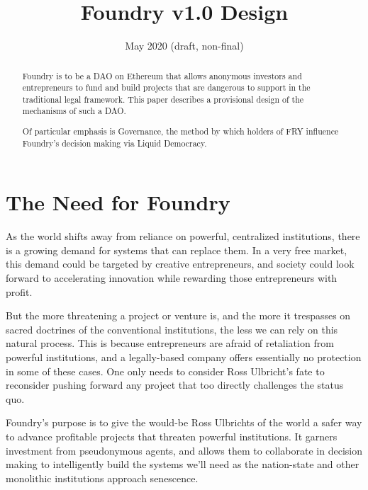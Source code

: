 \documentclass{article}
\title{Foundry v1.0 Design}
\date{May 2020 (draft, non-final)}
\begin{document}

\maketitle
\begin{abstract}
	\setlength{\parskip}{1em}
	Foundry is to be a DAO on Ethereum that allows anonymous investors and entrepreneurs to fund and build projects that are dangerous to support in the traditional legal framework. This paper describes a provisional design of the mechanisms of such a DAO.
	
	Of particular emphasis is Governance, the method by which holders of FRY influence Foundry's decision making via Liquid Democracy.
\end{abstract}

\newpage
{}
\tableofcontents

\setlength{\parskip}{0.5em}

\newpage
{}
\section{The Need for Foundry} \label{need}

As the world shifts away from reliance on powerful, centralized institutions, there is a growing demand for systems that can replace them. In a very free market, this demand could be targeted by creative entrepreneurs, and society could look forward to accelerating innovation while rewarding those entrepreneurs with profit.

But the more threatening a project or venture is, and the more it trespasses on sacred doctrines of the conventional institutions, the less we can rely on this natural process. This is because entrepreneurs are afraid of retaliation from powerful institutions, and a legally-based company offers essentially no protection in some of these cases. One only needs to consider Ross Ulbricht's fate to reconsider pushing forward any project that too directly challenges the status quo.

Foundry's purpose is to give the would-be Ross Ulbrichts of the world a safer way to advance profitable projects that threaten powerful institutions. It garners investment from pseudonymous agents, and allows them to collaborate in decision making to intelligently build the systems we'll need as the nation-state and other monolithic institutions approach senescence.
\end{document}

